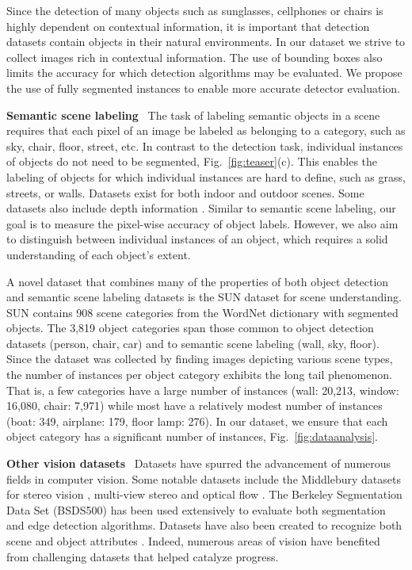 Since the detection of many objects such as sunglasses, cellphones or chairs is highly dependent on contextual information, it is important that detection datasets contain objects in their natural environments. In our dataset we strive to collect images rich in contextual information. The use of bounding boxes also limits the accuracy for which detection algorithms may be evaluated. We propose the use of fully segmented instances to enable more accurate detector evaluation.

\textbf{Semantic scene labeling}~ The task of labeling semantic objects in a scene requires that each pixel of an image be labeled as belonging to a category, such as sky, chair, floor, street, etc. In contrast to the detection task, individual instances of objects do not need to be segmented, Fig.~\ref{fig:teaser}(c). This enables the labeling of objects for which individual instances are hard to define, such as grass, streets, or walls. Datasets exist for both indoor \cite{NYUDepth} and outdoor \cite{shotton2009textonboost,brostow2009semantic} scenes. Some datasets also include depth information \cite{NYUDepth}. Similar to semantic scene labeling, our goal is to measure the pixel-wise accuracy of object labels. However, we also aim to distinguish between individual instances of an object, which requires a solid understanding of each object's extent.

A novel dataset that combines many of the properties of both object detection and semantic scene labeling datasets is the SUN dataset \cite{SUN} for scene understanding. SUN contains 908 scene categories from the WordNet dictionary \cite{wordnet} with segmented objects. The 3,819 object categories span those common to object detection datasets (person, chair, car) and to semantic scene labeling (wall, sky, floor). Since the dataset was collected by finding images depicting various scene types, the number of instances per object category exhibits the long tail phenomenon. That is, a few categories have a large number of instances (wall: 20,213, window: 16,080, chair: 7,971) while most have a relatively modest number of instances (boat: 349, airplane: 179, floor lamp: 276). In our dataset, we ensure that each object category has a significant number of instances, Fig.~\ref{fig:dataanalysis}.

\textbf{Other vision datasets}~ Datasets have spurred the advancement of numerous fields in computer vision. Some notable datasets include the Middlebury datasets for stereo vision \cite{scharstein2002taxonomy}, multi-view stereo \cite{seitz2006comparison} and optical flow \cite{baker2011database}. The Berkeley Segmentation Data Set (BSDS500) \cite{amfm_pami2011} has been used extensively to evaluate both segmentation and edge detection algorithms. Datasets have also been created to recognize both scene \cite{Patterson2012SunAttributes} and object attributes \cite{farhadi2009describing,lampert2009learning}. Indeed, numerous areas of vision have benefited from challenging datasets that helped catalyze progress.

